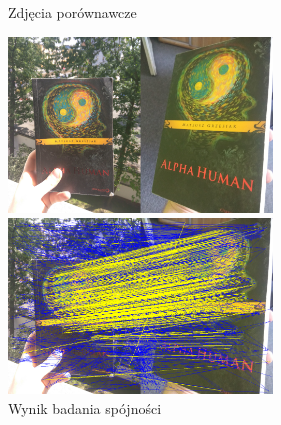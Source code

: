 \documentclass[../main.tex]{subfiles}
\begin{document}
    \begin{figure}[H]
    \centering
    \begin{minipage}{.5\textwidth}
        \caption{Zdjęcia porównawcze}
        \centering
        \includegraphics[width=7cm]{book__clean_out}
    \end{minipage}%
    \begin{minipage}{.5\textwidth}
        \caption{Wynik badania spójności}
        \centering
        \includegraphics[width=7cm]{book__pairs_conspairs_out}
    \end{minipage}%
    \end{figure}
\end{document}
